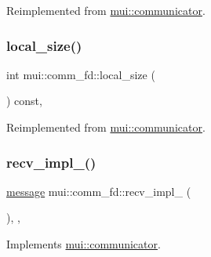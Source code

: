 Reimplemented from \hyperlink{classmui_1_1communicator_a83311811022225d758dd86866e620466}{mui\+::communicator}.

\mbox{\label{classmui_1_1comm__fd_a9c119bf4de88c8047488750deb2e78ef}} 
\subsubsection{\texorpdfstring{local\+\_\+size()}{local\_size()}}
{\footnotesize\ttfamily int mui\+::comm\+\_\+fd\+::local\+\_\+size (\begin{DoxyParamCaption}{ }\end{DoxyParamCaption}) const\hspace{0.3cm}{\ttfamily [inline]}, {\ttfamily [virtual]}}



Reimplemented from \hyperlink{classmui_1_1communicator_aa98faead0a9f63b8edb8b987477998e1}{mui\+::communicator}.

\mbox{\label{classmui_1_1comm__fd_a426bda7ebea0817e24fef87552993756}} 
\subsubsection{\texorpdfstring{recv\+\_\+impl\+\_\+()}{recv\_impl\_()}}
{\footnotesize\ttfamily \hyperlink{structmui_1_1message}{message} mui\+::comm\+\_\+fd\+::recv\+\_\+impl\+\_\+ (\begin{DoxyParamCaption}{ }\end{DoxyParamCaption})\hspace{0.3cm}{\ttfamily [inline]}, {\ttfamily [protected]}, {\ttfamily [virtual]}}



Implements \hyperlink{classmui_1_1communicator_ab52ebf7dd059acdd144493cd76c62c5f}{mui\+::communicator}.

\mbox{\label{classmui_1_1comm__fd_a6d5e989af8268c87b7c7bcd18a0a9a11}} 
